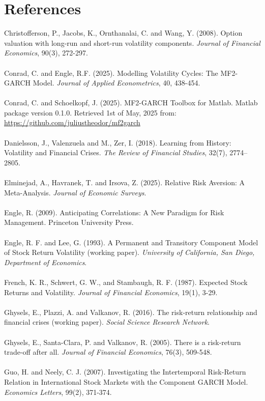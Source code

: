 \documentclass[12pt]{article}
\begin{document}
\section{References}
Christofferson, P., Jacobs, K., Ornthanalai, C. and Wang, Y. (2008). Option valuation with long-run and short-run volatility components. \textit{Journal of Financial Economics}, 90(3), 272-297.\\\\
Conrad, C. and Engle, R.F. (2025). Modelling Volatility Cycles: The MF2-GARCH Model. \textit{Journal of Applied Econometrics}, 40, 438-454.\\\\
Conrad, C. and Schoelkopf, J. (2025). MF2-GARCH Toolbox for Matlab. Matlab package version 0.1.0. Retrieved 1st of May, 2025 from: \url{https://github.com/juliustheodor/mf2garch}\\\\
Danielsson, J., Valenzuela and M., Zer, I. (2018). Learning from History: Volatility and Financial Crises. \textit{The Review of Financial Studies}, 32(7), 2774–2805.\\\\
Elminejad, A., Havranek, T. and Irsova, Z. (2025). Relative Risk Aversion: A Meta-Analysis. \textit{Journal of Economic Surveys}.\\\\
Engle, R. (2009). Anticipating Correlations: A New Paradigm for Risk Management. Princeton University Press.\\\\
Engle, R. F. and Lee, G. (1993). A Permanent and Transitory Component Model of Stock Return Volatility (working paper). \textit{University of California, San Diego, Department of Economics}.\\\\
French, K. R., Schwert, G. W., and Stambaugh, R. F. (1987). Expected Stock Returns and Volatility. \textit{Journal of Financial Economics}, 19(1), 3-29.\\\\
Ghysels, E., Plazzi, A. and Valkanov, R. (2016). The risk‑return relationship and financial crises (working paper). \textit{Social Science Research Network}.\\\\
Ghysels, E., Santa-Clara, P. and Valkanov, R. (2005). There is a risk-return trade-off after all. \textit{Journal of Financial Economics}, 76(3), 509-548.\\\\
Guo, H. and Neely, C. J. (2007). Investigating the Intertemporal Risk-Return Relation in International Stock Markets with the Component GARCH Model. \textit{Economics Letters}, 99(2), 371-374.\\\\
\end{document}
